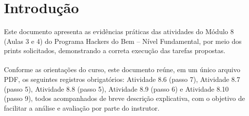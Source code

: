 \section{Introdução}

\paragraph{}
Este documento apresenta as evidências práticas das atividades do Módulo 8
(Aulas 3 e 4) do Programa Hackers do Bem -- Nível Fundamental, por meio dos
prints solicitados, demonstrando a correta execução das tarefas propostas.

\paragraph{}
Conforme as orientações do curso, este documento reúne, em um único arquivo
PDF, os seguintes registros obrigatórios: Atividade 8.6 (passo 7), Atividade
8.7 (passo 5), Atividade 8.8 (passo 5), Atividade 8.9 (passo 6) e Atividade
8.10 (passo 9), todos acompanhados de breve descrição explicativa, com o
objetivo de facilitar a análise e avaliação por parte do instrutor.
